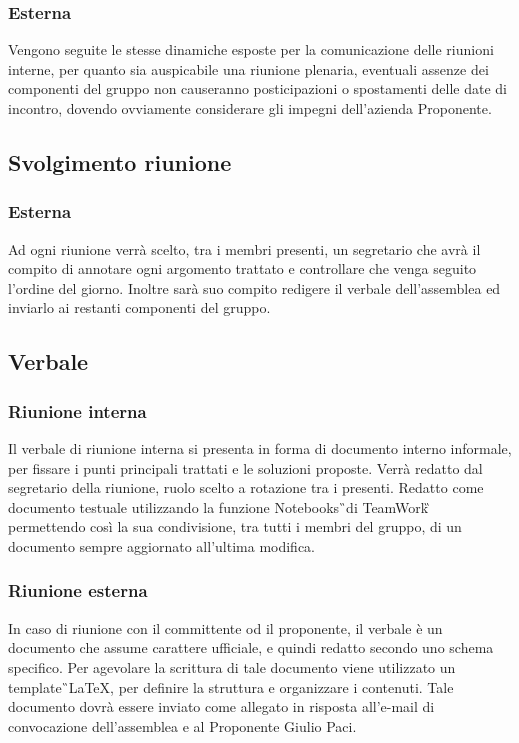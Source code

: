 \subsubsection {Esterna}
Vengono seguite le stesse dinamiche esposte per la comunicazione delle riunioni 
interne, per quanto sia auspicabile una riunione plenaria, eventuali assenze 
dei componenti del gruppo non causeranno posticipazioni o spostamenti delle 
date di incontro, dovendo ovviamente considerare gli impegni dell'azienda 
Proponente.

\subsection{Svolgimento riunione}
\subsubsection{Esterna}
Ad ogni riunione verrà scelto, tra i membri presenti, un segretario che avrà il 
compito di annotare ogni argomento trattato e controllare che venga seguito 
l'ordine del giorno. Inoltre sarà suo compito redigere il verbale 
dell'assemblea ed inviarlo ai restanti componenti del gruppo.

\subsection{Verbale}
\subsubsection{Riunione interna}
Il verbale di riunione interna si presenta in forma di documento interno 
informale, per fissare i punti principali trattati e le soluzioni proposte.
Verrà redatto dal segretario della riunione, ruolo scelto a rotazione tra i 
presenti.
Redatto come documento testuale utilizzando la funzione Notebooks\G\ di 
TeamWork\G\, permettendo così la sua condivisione, tra tutti i membri del 
gruppo, di un documento sempre aggiornato all'ultima modifica.

\subsubsection{Riunione esterna}
In caso di riunione con il committente od il proponente, il verbale è un 
documento che assume carattere ufficiale, e quindi redatto secondo uno schema 
specifico.
Per agevolare la scrittura di tale documento viene utilizzato un template\G\ 
\LaTeX, per definire la struttura e organizzare i contenuti. Tale documento 
dovrà essere inviato come allegato in risposta all'e-mail di convocazione 
dell'assemblea e al Proponente Giulio Paci.